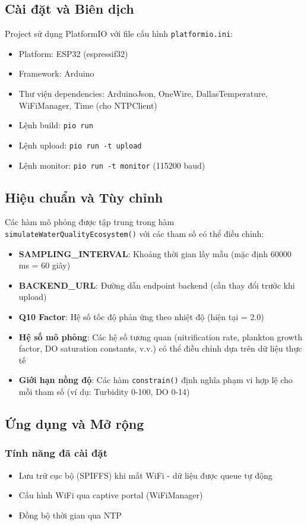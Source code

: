 \subsection{Cài đặt và Biên dịch}
Project sử dụng PlatformIO với file cấu hình \texttt{platformio.ini}:
\begin{itemize}
    \item Platform: ESP32 (espressif32)
    \item Framework: Arduino
    \item Thư viện dependencies: ArduinoJson, OneWire, DallasTemperature, WiFiManager, Time (cho NTPClient)
    \item Lệnh build: \texttt{pio run}
    \item Lệnh upload: \texttt{pio run -t upload}
    \item Lệnh monitor: \texttt{pio run -t monitor} (115200 baud)
\end{itemize}

\subsection{Hiệu chuẩn và Tùy chỉnh}
Các hàm mô phỏng được tập trung trong hàm \texttt{simulateWaterQualityEcosystem()} với các tham số có thể điều chỉnh:
\begin{itemize}
    \item \textbf{SAMPLING\_INTERVAL}: Khoảng thời gian lấy mẫu (mặc định 60000 ms = 60 giây)
    \item \textbf{BACKEND\_URL}: Đường dẫn endpoint backend (cần thay đổi trước khi upload)
    \item \textbf{Q10 Factor}: Hệ số tốc độ phản ứng theo nhiệt độ (hiện tại = 2.0)
    \item \textbf{Hệ số mô phỏng}: Các hệ số tương quan (nitrification rate, plankton growth factor, DO saturation constants, v.v.) có thể điều chỉnh dựa trên dữ liệu thực tế
    \item \textbf{Giới hạn nồng độ}: Các hàm \texttt{constrain()} định nghĩa phạm vi hợp lệ cho mỗi tham số (ví dụ: Turbidity 0-100, DO 0-14)
\end{itemize}

\subsection{Ứng dụng và Mở rộng}
\subsubsection{Tính năng đã cài đặt}
\begin{itemize}
    \item Lưu trữ cục bộ (SPIFFS) khi mất WiFi - dữ liệu được queue tự động
    \item Cấu hình WiFi qua captive portal (WiFiManager)
    \item Đồng bộ thời gian qua NTP
\end{itemize}

